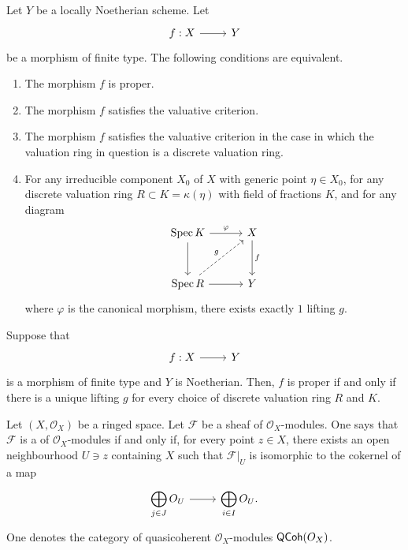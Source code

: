 \documentclass [11 pt, oneside] {article}
\begin{document}
\begin{theorem}\label{}\index{}\text{}
Let $Y$ be a locally Noetherian scheme. Let 
\[
\begin{tikzcd}
f:X\ar[r]&Y
\end{tikzcd}
\]  
be a morphism of finite type. The following conditions are equivalent.
\begin{enumerate}
	\item The morphism $f$ is proper.
	\item The morphism $f$ satisfies the valuative criterion.
	\item The morphism $f$ satisfies the valuative criterion in the case in which the valuation ring in question is a discrete valuation ring.
	\item For any irreducible component $X_0$ of $X$ with generic point $\eta \in X_0$, for any discrete valuation ring $R \subset K = \kappa(\eta)$ with field of fractions $K$, and for any diagram
		\[
		\begin{tikzcd}[row sep = 3 em, column sep = 3 em]
			\Spec K \ar[r,"\varphi"]\ar[d] &X\ar[d, "f"]\\ \Spec R \ar[r]\ar[ur,dashed, "g"] & Y
		\end{tikzcd}
		\]
		where $\varphi$ is the canonical morphism, there exists exactly $1$ lifting $g$.
\end{enumerate}
\end{theorem}

\begin{remark}
	Suppose that
	\[
\begin{tikzcd}
f:X\ar[r]&Y
\end{tikzcd}
\]  is a morphism of finite type and $Y$ is Noetherian. Then, $f$ is proper if and only if there is a unique lifting $g$ for every choice of discrete valuation ring $R$ and $K$. 
\end{remark}

\begin{definition}\label{}\text{}
Let $(X, \mathscr{O}_X)$ be a ringed space. Let $\mathscr{F}$ be a sheaf of $\mathscr{O}_X$-modules. One says that $\mathscr{F}$ is a  of $\mathscr{O}_X$-modules if and only if, for every point $z\in X$, there exists an open neighbourhood $U\ni z$ containing $X$ such that $\mathscr{F}\big|_U$ is isomorphic to the cokernel of a map
\[
\begin{tikzcd}
\displaystyle\bigoplus_{j\in J}\mathscr{O}_U \ar[r]& \displaystyle\bigoplus_{i\in I}\mathscr{O}_U.
\end{tikzcd}
\] 
One denotes the category of quasicoherent $\mathscr{O}_X$-modules $\textsf{QCoh}(\relax{O}_X)$.
\end{definition}
\end{document}
